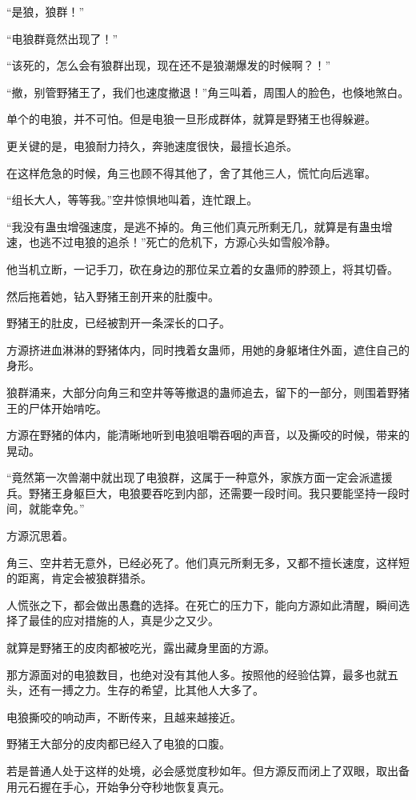 \begin{this_body}
“是狼，狼群！”

“电狼群竟然出现了！”

“该死的，怎么会有狼群出现，现在还不是狼潮爆发的时候啊？！”

“撤，别管野猪王了，我们也速度撤退！”角三叫着，周围人的脸色，也倏地煞白。

单个的电狼，并不可怕。但是电狼一旦形成群体，就算是野猪王也得躲避。

更关键的是，电狼耐力持久，奔驰速度很快，最擅长追杀。

在这样危急的时候，角三也顾不得其他了，舍了其他三人，慌忙向后逃窜。

“组长大人，等等我。”空井惊惧地叫着，连忙跟上。

“我没有蛊虫增强速度，是逃不掉的。角三他们真元所剩无几，就算是有蛊虫增速，也逃不过电狼的追杀！”死亡的危机下，方源心头如雪般冷静。

他当机立断，一记手刀，砍在身边的那位呆立着的女蛊师的脖颈上，将其切昏。

然后拖着她，钻入野猪王剖开来的肚腹中。

野猪王的肚皮，已经被割开一条深长的口子。

方源挤进血淋淋的野猪体内，同时拽着女蛊师，用她的身躯堵住外面，遮住自己的身形。

狼群涌来，大部分向角三和空井等等撤退的蛊师追去，留下的一部分，则围着野猪王的尸体开始啃吃。

方源在野猪的体内，能清晰地听到电狼咀嚼吞咽的声音，以及撕咬的时候，带来的晃动。

“竟然第一次兽潮中就出现了电狼群，这属于一种意外，家族方面一定会派遣援兵。野猪王身躯巨大，电狼要吞吃到内部，还需要一段时间。我只要能坚持一段时间，就能幸免。”

方源沉思着。

角三、空井若无意外，已经必死了。他们真元所剩无多，又都不擅长速度，这样短的距离，肯定会被狼群猎杀。

人慌张之下，都会做出愚蠢的选择。在死亡的压力下，能向方源如此清醒，瞬间选择了最佳的应对措施的人，真是少之又少。

就算是野猪王的皮肉都被吃光，露出藏身里面的方源。

那方源面对的电狼数目，也绝对没有其他人多。按照他的经验估算，最多也就五头，还有一搏之力。生存的希望，比其他人大多了。

电狼撕咬的响动声，不断传来，且越来越接近。

野猪王大部分的皮肉都已经入了电狼的口腹。

若是普通人处于这样的处境，必会感觉度秒如年。但方源反而闭上了双眼，取出备用元石握在手心，开始争分夺秒地恢复真元。

\end{this_body}


